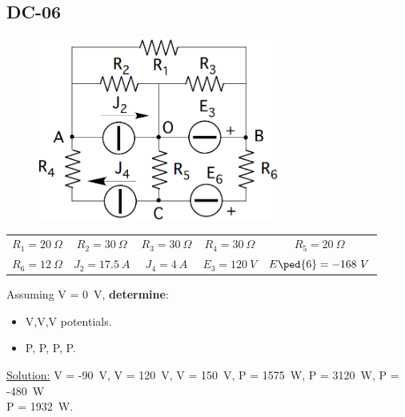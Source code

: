 \subsection{DC-06}
\begin{figure}[h]
\includegraphics[height=6cm]{img/1/06.png}
\centering
\end{figure}
\begin{center}
\begin{tabular}{ c c c c c}
  $R_1 = 20 \ \Omega$ & $R_2 = 30 \ \Omega$ & $R_3 = 30 \ \Omega$ & $R_4 = 30 \ \Omega$ & $R_5 = 20 \ \Omega$\\
  $R_6 = 12\ \Omega$ & $J_2 = 17.5\ A$ & $J_4 = 4 \ A$& $E_3 = 120 \ V$& $E\ped{6} = -168 \ V$  \\
\end{tabular}
\end{center}
Assuming V = 0\ V, \textbf{determine}:
\begin{itemize}
  \item V,V,V potentials.
  \item P, P, P, P. 
\end{itemize}
\underline{\large{Solution:}}
\newline
V = -90\ V, V = 120\ V, V = 150\ V, P = 1575\ W, P = 3120\ W, P = -480\ W\\ P = 1932\ W.
\newpage
